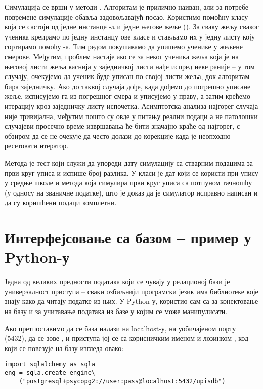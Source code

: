 Симулација се врши у методи . Алгоритам је прилично наиван, али за потребе повремене симулације обавља задовољавајућ посао. Користимо помоћну класу  која се састоји од једне инстанце -a и једне његове жеље (). За сваку жељу сваког ученика креирамо по једну инстанцу ове класе и стављамо их у једну листу коју сортирамо помоћу -а. Тим редом покушавамо да упишемо ученике у жељене смерове. Међутим, проблем настаје ако се за неког ученика жеља која је на његовој листи жеља каснија у заједничкој листи нађе испред неке раније -- у том случају, очекујемо да ученик буде уписан по својој листи жеља, док алгоритам бира заједничку. Ако до таквој случаја дође, када дођемо до погрешно уписане жеље, исписујемо га из погрешног смера и уписујемо у праву, а затим крећемо итерацију кроз заједничку листу испочетка. Асимптотска анализа најгорег случаја није тривијална, међутим пошто су овде у питању реални подаци а не патолошки случајеви просечно време извршавања ће бити значајно краће од најгорег, с обзиром да се не очекује да често долази до корекције када је неопходно ресетовати итератор. %

Метода  је тест који служи да упореди дату симулацију са стварним подацима за први круг уписа и испише број разлика. У класи  је дат  који се користи при упису у средње школе и  метода која симулира први круг уписа са потпуном тачношћу (у односу на званичне податке), што је доказ да је симулатор исправно написан и да су коришћени подаци комплетни.


\section{Интерфејсовање са базом -- пример у Python-у}

Једна од великих предности података који се чувају у релационој бази је универзалност приступа -- сваки озбиљнији програмски језик има библиотеке које знају како да читају податке из њих. У Python-у, користио сам  са  за конектовање на базу и  за учитавање података из базе у  којим се може манипулисати.

Ако претпоставимо да се база налази на localhost-у, на уобичајеном порту (5432), да се зове , и приступа јој се са корисничким именом  и лозинком , код који се повезује на базу изгледа овако:
\begin{verbatim}
import sqlalchemy as sqla
eng = sqla.create_engine\
    ("postgresql+psycopg2://user:pass@localhost:5432/upisdb")
\end{verbatim}

